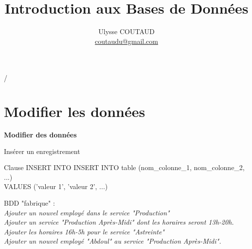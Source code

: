 \documentclass[xetex,dvipsnames]{beamer}
\begin{document}
\title{Introduction aux Bases de Données}

 {   \hspace{1em} \insertframenumber/\inserttotalframenumber }

\author{Ulysse COUTAUD\\\href{mailto:coutaudu@gmail.com}{\small coutaudu@gmail.com}}
\date{}
	
\maketitle

\section{Modifier les données}
\begin{frame}
\begin{center}
{\LARGE \textbf{Modifier des données}}
\end{center}
\end{frame}

\begin{frame}[t]{Insérer un enregistrement}
	
	\begin{alertblock}{Clause INSERT INTO}
	INSERT INTO table (nom\_colonne\_1, nom\_colonne\_2, ...) \\VALUES ('valeur 1', 'valeur 2', ...)
	\end{alertblock}
		
	\begin{scriptsize}
	\vspace{1em}
	BDD "fabrique" :\\
	\vspace{0.5em}
	\textit{Ajouter un nouvel employé dans le service "Production"}\\
	\textit{Ajouter un service "Production Après-Midi" dont les horaires seront 13h-20h.}\\
	\textit{Ajouter les horaires 16h-5h pour le service "Astreinte"}\\
	\textit{Ajouter un nouvel employé "Abdoul" au service "Production Après-Midi".}\\
	\end{scriptsize}
\end{frame}
\end{document}
